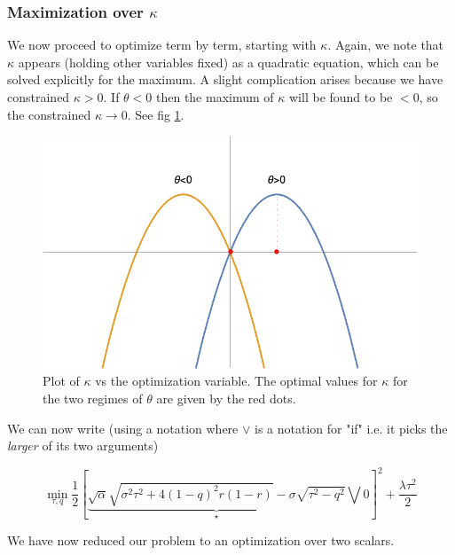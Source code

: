 \subsubsection{Maximization over $\kappa$}

We now proceed to optimize term by term, starting with $\kappa$. 
Again, we note that $\kappa$ appears (holding other variables fixed) as a quadratic equation, which can be solved explicitly for the maximum.
A slight complication arises because we have constrained $\kappa > 0$. 
If $\theta<0$ then the maximum of $\kappa$ will be found to be $<0$, so the constrained $\kappa \rightarrow 0$. 
See fig \ref{fig:analytic_optimal_kappa}. 

\begin{figure}
\begin{center}
	\includegraphics[scale=.5]{figures/twokappa.png}
\end{center}
\caption{Plot of $\kappa$ vs the optimization variable. The optimal values for $\kappa$ for the two regimes of $\theta$ are given by the red dots.}
\label{fig:analytic_optimal_kappa}
\end{figure}


We can now write (using a notation where $\vee$ is a notation for "if" i.e. it picks the \textit{larger} of its two arguments)

\begin{equation}\label{eq:optimal_tau_q}
	\min_{\tau, q }
	\frac{1}{2}\left[ 
	\underbrace{
		\sqrt{\alpha}\sqrt{\sigma^2\tau^2 + 4 \left( 1-q \right)^2r(1-r)}
	-\sigma\sqrt{\tau^2 - q^2}  }_{\star}
	\bigvee 0 \right]^2 + 
	\frac{\lambda\tau^2}{2}
\end{equation}

We have now reduced our problem to an optimization over two scalars. 

